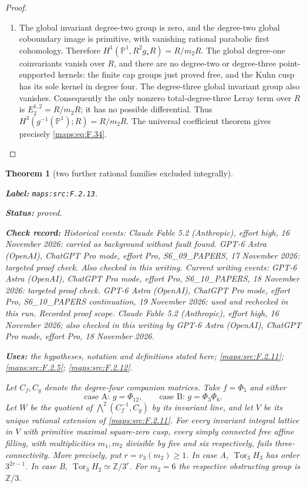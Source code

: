 \documentclass[11pt,a4paper]{article}
\newtheorem{theorem}{Theorem}[section]
\theoremstyle{definition}
\newcommand{\StatementRecord}[4]{\par\smallskip\begingroup\upshape\raggedright\noindent\textbf{Label:} \nolinkurl{#1}.\par\noindent\textbf{Status:} #2.\par\noindent\textbf{Check record:} #3.\par\noindent\textbf{Uses:} #4.\par\endgroup\smallskip}
\begin{document}
\begin{proof}
\begin{enumerate}[label=\arabic*.]
\item The global invariant degree-two group is zero, and the
degree-two global coboundary image is primitive, with
vanishing rational parabolic first cohomology.  Therefore
$H^1(\mathbb P^1,R^2g_*R)=R/m_2R$.
The global degree-one coinvariants vanish over $R$, and
there are no degree-two or degree-three point-supported
kernels: the finite cap groups just proved free, and the
Kuhn cusp has its sole kernel in degree four.
The degree-three global invariant group also vanishes.
Consequently the only nonzero total-degree-three Leray
term over $R$ is $E_2^{1,2}=R/m_2R$; it has no possible
differential.  Thus $H^3(g^{-1}(\mathbb P^1);R)=R/m_2R$.
The universal coefficient theorem gives precisely \eqref{maps:eq:F.34}.

\end{enumerate}
\end{proof}




\begin{theorem}[two further rational families excluded integrally]\label{maps:src:F.2.13}
\StatementRecord{maps:src:F.2.13}{proved}{Historical events: Claude Fable 5.2 (Anthropic), effort high, 16 November 2026: carried as background without fault found. GPT-6 Astra (OpenAI), ChatGPT Pro mode, effort Pro, S6\_09\_PAPERS, 17 November 2026: targeted proof check. Also checked in this writing. Current writing events: GPT-6 Astra (OpenAI), ChatGPT Pro mode, effort Pro, S6\_10\_PAPERS, 18 November 2026: targeted proof check. GPT-6 Astra (OpenAI), ChatGPT Pro mode, effort Pro, S6\_10\_PAPERS continuation, 19 November 2026: used and rechecked in this run. \emph{Recorded proof scope.} Claude Fable 5.2 (Anthropic), effort high, 16 November 2026; also checked in this writing by GPT-6 Astra (OpenAI), ChatGPT Pro mode, effort Pro, 18 November 2026}{the hypotheses, notation and definitions stated here; \cref{maps:src:F.2.11}; \cref{maps:src:F.2.5}; \cref{maps:src:F.2.12}}


Let $C_f,C_g$ denote the degree-four companion matrices.
Take $f=\Phi_5$ and either
\[
 \text{case A: }g=\Phi_{12},\qquad
 \text{case B: }g=\Phi_3\Phi_6.
 \tag{F.36}\label{maps:eq:F.36}
\]
Let $W$ be the quotient of
$\bigwedge^2(C_f^{-1},C_g)$ by its invariant line, and
let $V$ be its unique rational extension of \ref{maps:src:F.2.11}.
For every invariant integral lattice in $V$ with primitive
maximal square-zero cusp, every simply connected free affine
filling, with multiplicities $m_1,m_2$ divisible by five and
six respectively, fails three-connectivity.
More precisely, put $r=v_3(m_2)\geq1$.
In case A, $\operatorname{Tor}_3 H_3$ has order
$3^{2r-1}$.  In case B,
$\operatorname{Tor}_3 H_2\simeq\mathbb Z/3^r$.
For $m_2=6$ the respective obstructing group is $\mathbb Z/3$.

\end{theorem}
\end{document}
